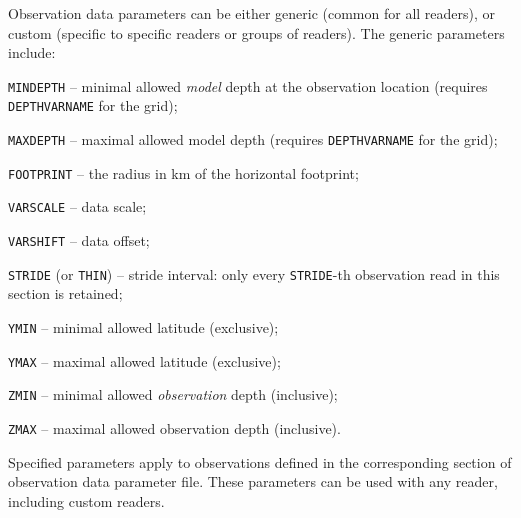 \documentclass[11pt]{report}
\begin{document}
Observation data parameters can be either generic (common for all readers), or custom (specific to specific readers or groups of readers).
The generic parameters include:
\begin{description}
\item{\verb|MINDEPTH|} -- minimal allowed \emph{model} depth at the observation location (requires \verb|DEPTHVARNAME| for the grid);
\item{\verb|MAXDEPTH|} -- maximal allowed model depth (requires \verb|DEPTHVARNAME| for the grid);
\item{\verb|FOOTPRINT|} -- the radius in km of the horizontal footprint;
\item{\verb|VARSCALE|} -- data scale;
\item{\verb|VARSHIFT|} -- data offset;
\item{\verb|STRIDE|} (or \verb|THIN|) -- stride interval: only every \verb|STRIDE|-th observation read in this section is retained;
\item{\verb|YMIN|} -- minimal allowed latitude (exclusive);
\item{\verb|YMAX|} -- maximal allowed latitude (exclusive);
\item{\verb|ZMIN|} -- minimal allowed \emph{observation} depth (inclusive);
\item{\verb|ZMAX|} -- maximal allowed observation depth (inclusive).
\end{description}
Specified parameters apply to observations defined in the corresponding section of observation data parameter file.
These parameters can be used with any reader, including custom readers.
\end{document}
